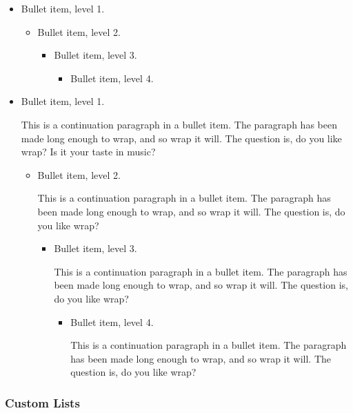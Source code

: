 \documentclass{article}
\begin{document}
\begin{itemize}
\item Bullet item, level 1.

\begin{itemize}
\item Bullet item, level 2.

\begin{itemize}
\item Bullet item, level 3.

\begin{itemize}
\item Bullet item, level 4.
\end{itemize}
\end{itemize}
\end{itemize}

\item Bullet item, level 1.

This is a continuation paragraph in a bullet item. The paragraph has been
made long enough to wrap, and so wrap it will. The question is, do you like
wrap? Is it your taste in music?

\begin{itemize}
\item Bullet item, level 2.

This is a continuation paragraph in a bullet item. The paragraph has been
made long enough to wrap, and so wrap it will. The question is, do you like
wrap?

\begin{itemize}
\item Bullet item, level 3.

This is a continuation paragraph in a bullet item. The paragraph has been
made long enough to wrap, and so wrap it will. The question is, do you like
wrap?

\begin{itemize}
\item Bullet item, level 4.

This is a continuation paragraph in a bullet item. The paragraph has been
made long enough to wrap, and so wrap it will. The question is, do you like
wrap?
\end{itemize}
\end{itemize}
\end{itemize}
\end{itemize}

\subsubsection{Custom Lists}
\end{document}
